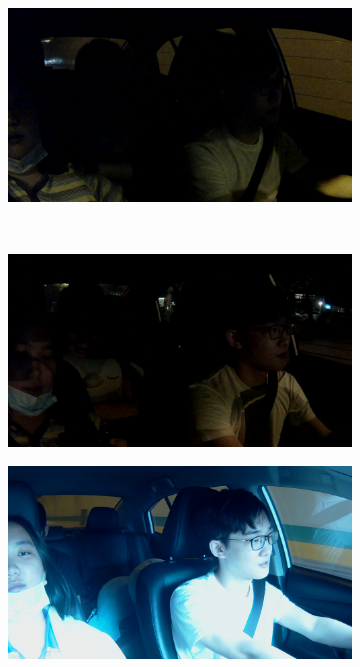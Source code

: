 \begin{figure}[t]
\begin{subfigure}[b]{0.22\textwidth}
\end{subfigure}
\begin{subfigure}[b]{0.22\textwidth}
    \includegraphics[width=\textwidth]{figures/car_4}
\end{subfigure} 
\\
\begin{subfigure}[b]{0.22\textwidth}
    \includegraphics[width=\textwidth]{figures/car_5}
\end{subfigure}
\begin{subfigure}[b]{0.22\textwidth}
    \includegraphics[width=\textwidth]{figures/car_6}

\end{subfigure}
\end{figure}
